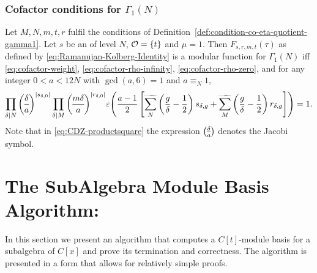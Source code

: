 \documentclass{article}
\begin{document}
\subsubsection{Cofactor conditions for $\Gamma_1(N)$}


\begin{Theorem}
  \cite[Thm~10.1]{ChenDuZhao_FindingModularFunctionsRamanujan_2019}
  \label{thm:condition-co-eta-quotient-gamma1}
  Let $M, N, m, t, r$ fulfil the conditions of
  Definition~\ref{def:condition-co-eta-quotient-gamma1}.
  Let $s$ be an  of level $N$,
  $\mathcal{O}=\left\{t\right\}$ and $\mu=1$.
  Then $F_{s,r,m,t}(\tau)$ as defined by
  \eqref{eq:Ramanujan-Kolberg-Identity} is a modular function for
  $\Gamma_1(N)$ iff \eqref{eq:cofactor-weight},
  \eqref{eq:cofactor-rho-infinity}, \eqref{eq:cofactor-rho-zero}, and
  for any integer $0<a<12N$ with $\gcd(a,6)=1$ and $a \equiv_N 1$,
  \begin{gather}
    \divisorprod{N} \jacobisymbol{\delta}{a}^{\abs{s_{\delta,0}}}
    \divisorprod{M} \jacobisymbol{m \delta}{a}^{\abs{r_{\delta,0}}}
    \unityPower{\frac{a-1}{2}
      \left[
      \gensum[N] \left( \frac{g}{\delta} - \frac{1}{2}\right) s_{\delta,g}
      +
      \gensum[M] \left( \frac{g}{\delta} - \frac{1}{2}\right) r_{\delta,g}
      \right]
    }
    =
    1.
    \label{eq:CDZ-productsquare}
  \end{gather}
  Note that in \eqref{eq:CDZ-productsquare} the expression
  $\jacobisymbol{\delta}{a}$ denotes the Jacobi symbol.
\end{Theorem}


\section{The SubAlgebra Module Basis Algorithm:
  \algoSamba{}}%
\label{sec:Algorithm}

In this section we present an algorithm that computes a $C[t]$-module
basis for a subalgebra of $C[x]$ and prove its termination and
correctness. The algorithm \algoSamba{} is presented in a form that
allows for relatively simple proofs.
\medskip
\end{document}
